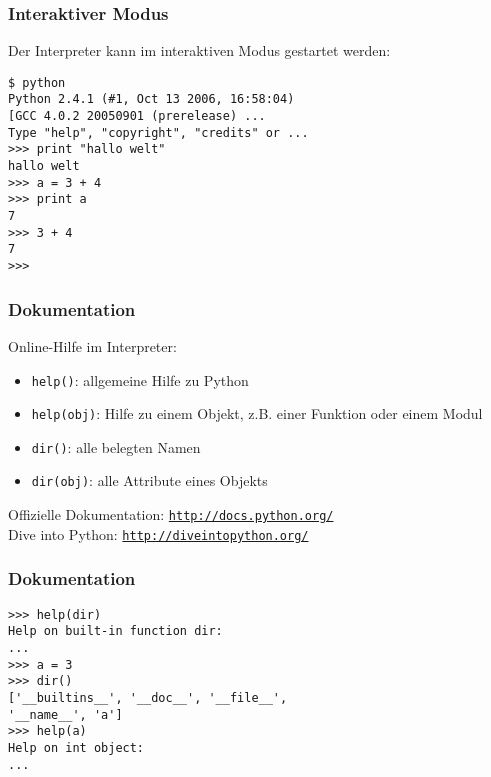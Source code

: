 \begin{frame}[fragile]
\frametitle{Interaktiver Modus}
Der Interpreter kann im interaktiven Modus gestartet werden:
\begin{lstlisting}[style=Shell]
$ python
Python 2.4.1 (#1, Oct 13 2006, 16:58:04)
[GCC 4.0.2 20050901 (prerelease) ...
Type "help", "copyright", "credits" or ...
>>> print "hallo welt"
hallo welt
>>> a = 3 + 4
>>> print a
7
>>> 3 + 4
7
>>>
\end{lstlisting} %
\end{frame}

\begin{frame}
\frametitle{Dokumentation}
Online-Hilfe im Interpreter:
\begin{itemize}
\item \lstinline{help()}: allgemeine Hilfe zu Python
\item \lstinline{help(obj)}: Hilfe zu einem Objekt, z.B. einer Funktion oder einem Modul
\item \lstinline{dir()}: alle belegten Namen 
\item \lstinline{dir(obj)}: alle Attribute eines Objekts
\end{itemize}
\vspace{5mm}
Offizielle Dokumentation: \alert{\underline{\texttt{http://docs.python.org/}}}\\
\vspace{5mm}
Dive into Python: \alert{\underline{\texttt{http://diveintopython.org/}}}

\end{frame}

\begin{frame}[fragile]
\frametitle{Dokumentation}
\begin{lstlisting}[style=Shell]
>>> help(dir)
Help on built-in function dir:
...
>>> a = 3
>>> dir()
['__builtins__', '__doc__', '__file__', 
'__name__', 'a']
>>> help(a)
Help on int object:
...
\end{lstlisting}
\end{frame}

